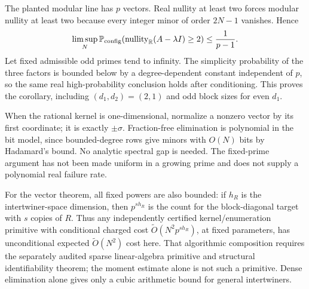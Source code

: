 \documentclass[11pt]{article}
\newcommand{\Prob}{\mathbb P}
\newcommand{\nullity}{\operatorname{nullity}}
\begin{document}
The planted modular line has $p$ vectors. Real nullity at least two forces modular nullity at least two because every integer minor of order $2N-1$ vanishes. Hence
\[
 \limsup_N\Prob_{\rm config}(\nullity_{\mathbb R}(A-\lambda I)\ge2)
 \le\frac1{p-1}.
\]
Let fixed admissible odd primes tend to infinity. The simplicity probability of the three factors is bounded below by a degree-dependent constant independent of $p$, so the same real high-probability conclusion holds after conditioning. This proves the corollary, including $(d_1,d_2)=(2,1)$ and odd block sizes for even $d_1$.

When the rational kernel is one-dimensional, normalize a nonzero vector by its first coordinate; it is exactly $\pm\sigma$. Fraction-free elimination is polynomial in the bit model, since bounded-degree rows give minors with $O(N)$ bits by Hadamard's bound. No analytic spectral gap is needed. The fixed-prime argument has not been made uniform in a growing prime and does not supply a polynomial real failure rate.

For the vector theorem, all fixed powers are also bounded: if $h_R$ is the intertwiner-space dimension, then $p^{s h_R}$ is the count for the block-diagonal target with $s$ copies of $R$. Thus any independently certified kernel/enumeration primitive with conditional charged cost $\widetilde O(N^2p^{s h_R})$, at fixed parameters, has unconditional expected $\widetilde O(N^2)$ cost here. That algorithmic composition requires the separately audited sparse linear-algebra primitive and structural identifiability theorem; the moment estimate alone is not such a primitive. Dense elimination alone gives only a cubic arithmetic bound for general intertwiners.
\end{document}
